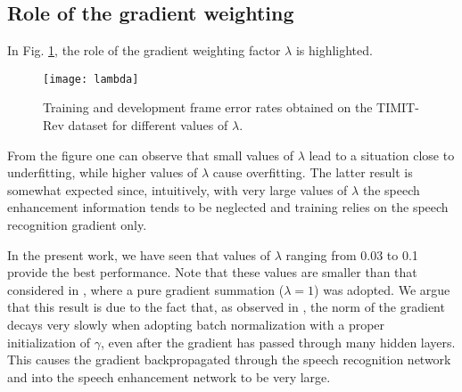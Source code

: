 \documentclass{article}
\begin{document}
\subsection{Role of the gradient weighting}
\label{sec:gw}
In Fig. \ref{fig:grad_w}, the role of the gradient weighting factor $\lambda $ is highlighted.
\begin{figure}
\centering
\texttt{[image: lambda]}
\caption{Training and development frame error rates obtained on the TIMIT-Rev dataset for different values of $\lambda$.}
\label{fig:grad_w}
\end{figure}
From the figure one can observe that small values of $\lambda$ lead to a situation close to underfitting, while higher values of $\lambda$ cause overfitting. The latter result is somewhat expected since, intuitively, with very large values of $\lambda$ the speech enhancement information tends to be neglected and training relies on the speech recognition gradient only.

In the present work, we have seen that values of $\lambda$ ranging from 0.03 to 0.1 provide the best performance. Note that these values are smaller than that considered in \cite{joint1,joint2}, where a pure gradient summation ($\lambda=1$) was adopted. We argue that this result is due to the fact that, as observed in \cite{initbn}, the norm of the gradient decays very slowly when adopting batch normalization with a proper initialization of $\gamma$, even after the gradient has passed through many hidden layers. This causes the gradient backpropagated through the speech recognition network and into the speech enhancement network to be very large. 


\end{document}
